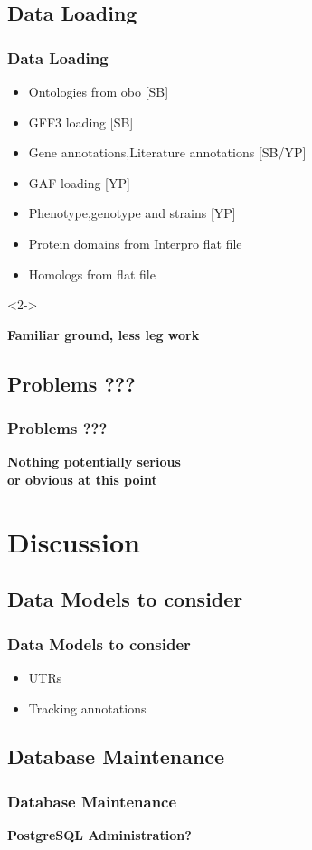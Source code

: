 \documentclass[hyperref={pdfpagelabels=false}, compress]{beamer}
\begin{document}
\subsection{Data Loading}
\begin{frame}
  	\frametitle{Data Loading}
  	\begin{itemize}
		\item Ontologies from obo [SB]
       	\item GFF3 loading [SB]
       	\item Gene annotations,Literature annotations [SB/YP]
       	\item GAF loading [YP]
       	\item Phenotype,genotype and strains [YP]
       	\item Protein domains from Interpro flat file
       	\item Homologs from flat file
  	\end{itemize}
  	
	\begin{block}{}<2->
  		\begin{center}
  			\textbf{\Large Familiar ground, less leg work}
		\end{center}
	\end{block}
	
\end{frame}

\subsection{Problems ???}  
\begin{frame}
	\frametitle{Problems ???} 
	\begin{center} 
		\textbf{\Large Nothing potentially serious\\ or obvious at this point}
	\end{center}
\end{frame}


\section{Discussion}
\subsection{Data Models to consider}
\begin{frame}
    \frametitle{Data Models to consider}
	\begin{itemize}
		\item UTRs
		\item Tracking annotations
	\end{itemize}        
\end{frame}

\subsection{Database Maintenance}
\begin{frame}
   \frametitle{Database Maintenance}
   \begin{center}
   		\textbf{\Large PostgreSQL Administration?}
   	\end{center}
\end{frame}

\end{document}
